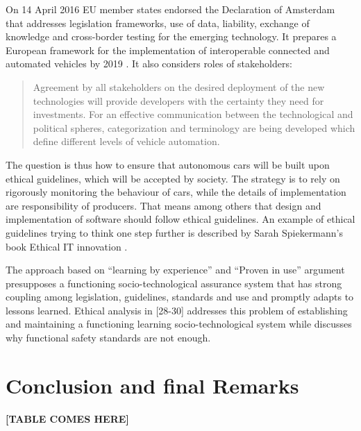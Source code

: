 On 14 April 2016 EU member states endorsed the Declaration of Amsterdam \cite{GovernmentNL2017} that addresses legislation frameworks, use of data, liability, exchange of knowledge and cross-border testing for the emerging technology. It prepares a European framework for the implementation of interoperable connected and automated vehicles by 2019 \cite{EthicsCommission2017b}. It also considers roles of stakeholders:

 \begin{quote}
 Agreement by all stakeholders on the desired deployment of the new technologies will provide developers with the certainty they need for investments. For an effective communication between the technological and political spheres, categorization and terminology are being developed which define different levels of vehicle automation. \cite{Pillath2016} %
 \end{quote} %
 
The question is thus how to ensure that autonomous cars will be built upon ethical guidelines, which will be accepted by society. The strategy is to rely on rigorously monitoring the behaviour of cars, while the details of implementation are responsibility of producers. That means among others that design and implementation of software should follow ethical guidelines. An example of ethical guidelines trying to think one step further is described by Sarah Spiekermann's book Ethical IT innovation \cite{spiekermann2015ethical}. 

The approach based on \enquote{learning by experience} and \enquote{Proven in use} argument \cite{GovernmentNL2017,NationalInstruments2014a,DBLP:journals/corr/SchabeB15} presupposes a functioning socio-technological assurance system that has strong coupling among legislation, guidelines, standards and use and promptly adapts to lessons learned. Ethical analysis in \cite{DodigCrnkovic2012, Thekkilakattil_7273594,Johnsen2017_7958474} [28-30] addresses this problem of establishing and maintaining a functioning learning socio-technological system while \cite{Johnsen2017_7958474} discusses why functional safety standards are not enough.


\section{Conclusion and final Remarks}
\label{sec:Conclusion}


\textbf{[TABLE COMES HERE]}



